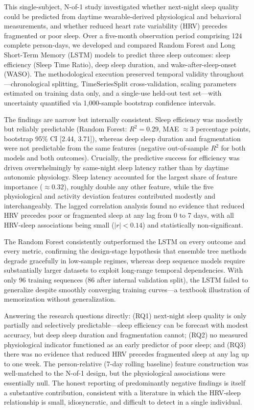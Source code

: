 \documentclass[fleqn,10pt]{wlscirep}
\begin{document}
This single-subject, N-of-1 study investigated whether next-night sleep quality could be predicted from daytime wearable-derived physiological and behavioral measurements, and whether reduced heart rate variability (HRV) precedes fragmented or poor sleep. Over a five-month observation period comprising 124 complete person-days, we developed and compared Random Forest and Long Short-Term Memory (LSTM) models to predict three sleep outcomes: sleep efficiency (Sleep Time Ratio), deep sleep duration, and wake-after-sleep-onset (WASO). The methodological execution preserved temporal validity throughout---chronological splitting, TimeSeriesSplit cross-validation, scaling parameters estimated on training data only, and a single-use held-out test set---with uncertainty quantified via 1,000-sample bootstrap confidence intervals.

The findings are narrow but internally consistent. Sleep efficiency was modestly but reliably predictable (Random Forest: $R^2 = 0.29$, MAE $\approx 3$ percentage points, bootstrap 95\% CI [2.44, 3.71]), whereas deep sleep duration and fragmentation were not predictable from the same features (negative out-of-sample $R^2$ for both models and both outcomes). Crucially, the predictive success for efficiency was driven overwhelmingly by same-night sleep latency rather than by daytime autonomic physiology. Sleep latency accounted for the largest share of feature importance ($\approx 0.32$), roughly double any other feature, while the five physiological and activity deviation features contributed modestly and interchangeably. The lagged correlation analysis found no evidence that reduced HRV precedes poor or fragmented sleep at any lag from 0 to 7 days, with all HRV-sleep associations being small ($|r| < 0.14$) and statistically non-significant.

The Random Forest consistently outperformed the LSTM on every outcome and every metric, confirming the design-stage hypothesis that ensemble tree methods degrade gracefully in low-sample regimes, whereas deep sequence models require substantially larger datasets to exploit long-range temporal dependencies. With only 96 training sequences (86 after internal validation split), the LSTM failed to generalize despite smoothly converging training curves---a textbook illustration of memorization without generalization.

Answering the research questions directly: (RQ1) next-night sleep quality is only partially and selectively predictable---sleep efficiency can be forecast with modest accuracy, but deep sleep duration and fragmentation cannot; (RQ2) no measured physiological indicator functioned as an early predictor of poor sleep; and (RQ3) there was no evidence that reduced HRV precedes fragmented sleep at any lag up to one week. The person-relative (7-day rolling baseline) feature construction was well-matched to the N-of-1 design, but the physiological associations were essentially null. The honest reporting of predominantly negative findings is itself a substantive contribution, consistent with a literature in which the HRV-sleep relationship is small, idiosyncratic, and difficult to detect in a single individual.
\end{document}
